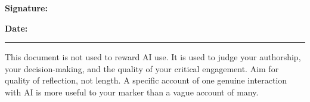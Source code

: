 \documentclass[manuscript,screen,nonacm]{acmart}
\begin{document}
\vspace{2em}
\noindent\textbf{Signature:} \hrulefill

\vspace{2em}
\noindent\textbf{Date:} \hspace{1em} \rule{4cm}{0.4pt}
\vspace{2em}

\begin{tcolorbox}[colback=orange!30,colframe=black,title=Reminder]
This document is not used to reward AI use. It is used to judge your authorship, your decision-making, and the quality of your critical engagement. Aim for quality of reflection, not length. A specific account of one genuine interaction with AI is more useful to your marker than a vague account of many.
\end{tcolorbox}
\end{document}
